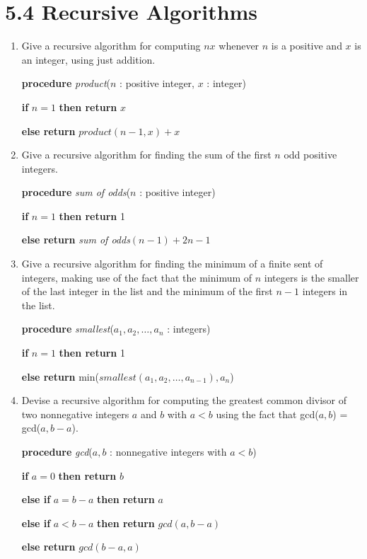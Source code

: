 \documentclass[11pt]{article}
\begin{document}
\section*{\textbf{5.4 Recursive Algorithms}}
\begin{enumerate}[label=\textbf{\arabic*.}]
	\item Give a recursive algorithm for computing $nx$ whenever $n$ is a positive and $x$ is an integer, using just addition.
	
	\textbf{procedure} \emph{product}($n$ : positive integer, $x$ : integer)
	
	\textbf{if} $n = 1$ \textbf{then return} $x$
	
	\textbf{else return} $product(n - 1, x) + x$
	
	\item Give a recursive algorithm for finding the sum of the first $n$ odd positive integers.
	
	\textbf{procedure} \emph{sum of odds}($n$ : positive integer)
	
	\textbf{if} $n = 1$ \textbf{then return} 1
	
	\textbf{else return} \emph{sum of odds}$(n - 1) + 2n - 1$
	
	\item Give a recursive algorithm for finding the minimum of a finite sent of integers, making use of the fact that the minimum of $n$ integers is the smaller of the last integer in the list and the minimum of the first $n - 1$ integers in the list.
	
	\textbf{procedure} \emph{smallest}($a_1, a_2, \ldots, a_n$ : integers)
	
	\textbf{if} $n = 1$ \textbf{then return} 1
	
	\textbf{else return} min($smallest(a_1, a_2, \ldots, a_{n - 1}), a_n$)
	
	\item Devise a recursive algorithm for computing the greatest common divisor of two nonnegative integers $a$ and $b$ with $a < b$ using the fact that gcd($a, b$) = gcd($a, b - a$).
	
	\textbf{procedure} \emph{gcd}($a, b$ : nonnegative integers with $a < b$)
	
	\textbf{if} $a = 0$ \textbf{then return} $b$
	
	\textbf{else if} $a = b - a$ \textbf{then return} $a$
	
	\textbf{else if} $a < b - a$ \textbf{then return} $gcd(a, b - a)$
	
	\textbf{else return} $gcd(b - a, a)$
	

\end{enumerate}
\end{document}

